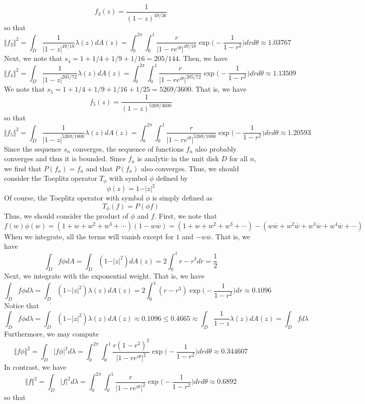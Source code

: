 \documentclass[12pt]{article}
\begin{document}
\[
f_3(z) = \frac{1}{(1-z)^{49/36}}
\] so that
\[
\Vert f_3 \Vert^2 = \int_D \frac{1}{\vert 1 - z \vert^{49/18}} \lambda(z) dA(z) = \int_0^{2\pi} \int_0^1 \frac{r}{\vert 1 - re^{i\theta} \vert^{49/18}} \exp\bigg(-\frac{1}{1-r^2}\bigg) dr d\theta \approx 1.03767
\] Next, we note that $s_4 = 1 + 1/4 + 1/9 + 1/16 = 205/144$. Then, we have
\[
\Vert f_4 \Vert^2 = \int_D \frac{1}{\vert 1 - z\vert^{205/72}} \lambda(z) dA(z) = \int_0^{2\pi} \int_0^1 \frac{r}{\vert 1 - re^{i\theta} \vert^{205/72}} \exp\bigg(-\frac{1}{1-r^2}\bigg) dr d\theta \approx 1.13509
\] We note that $s_5 = 1 + 1/4 + 1/9 + 1/16 + 1/25 = 5269/3600$. That is, we have
\[
f_5(z) = \frac{1}{(1-z)^{5269/3600}}
\] so that
\[
\Vert f_5 \Vert^2 = \int_D \frac{1}{\vert 1 - z\vert^{5269/1800}} \lambda(z) dA(z) = \int_0^{2\pi} \int_0^1 \frac{r}{\vert 1 - re^{i\theta} \vert^{5269/1800}} \exp\bigg(-\frac{1}{1-r^2}\bigg) dr d\theta \approx 1.20593
\] Since the sequence $s_n$ converges, the sequence of functions $f_n$ also probably converges and thus it is bounded. Since $f_n$ is analytic in the unit disk $D$ for all $n$, we find that $P(f_n) = f_n$ and that $P(f_n)$ also converges. Thus, we should consider the Toeplitz operator $T_\phi$ with symbol $\phi$ defined by 
\[
\phi(z) = 1 - \vert z \vert^2
\] Of course, the Toeplitz operator with symbol $\phi$ is simply defined as
\[
T_\phi(f) = P(\phi f)
\] Thus, we should consider the product of $\phi$ and $f$. First, we note that
\[
f(w) \phi(w) = (1+w+w^2+w^3+\cdots)(1-w\overline{w}) = (1  + w + w^2 + w^3 +\cdots) - (w\overline{w} + w^2 \overline{w} + w^3\overline{w} + w^4 \overline{w} + \cdots)
\] When we integrate, all the terms will vanish except for $1$ and $-w\overline{w}$. That is, we have
\[
\int_D f\phi dA = \int_D (1- \vert z \vert^2) dA(z) = 2 \int_0^1 r - r^3 dr = \frac{1}{2}
\] Next, we integrate with the exponential weight. That is, we have
\[
\int_D f \phi d\lambda = \int_D (1 - \vert z \vert^2) \lambda(z) dA(z) = 2 \int_0^1 (r - r^3)\exp\bigg(-\frac{1}{1-r^2}\bigg) dr \approx 0.1096
\] Notice that
\[
\int_D f \phi d\lambda = \int_D (1 - \vert z \vert^2) \lambda(z) dA(z) \approx 0.1096 \leq 0.4665 \approx \int_D \frac{1}{1-z} \lambda(z) dA(z) = \int_D f d\lambda
\] Furthermore, we may compute
\[
\Vert f\phi \Vert^2 = \int_D \vert f\phi \vert^2 d\lambda = \int_0^{2\pi} \int_0^1 \frac{r(1-r^2)^2}{\vert 1 - re^{i\theta}\vert^2} \exp\bigg(-\frac{1}{1-r^2}\bigg) dr d\theta \approx 0.344607
\] In contrast, we have
\[
\Vert f \Vert^2 = \int_D \vert f \vert^2 d\lambda = \int_0^{2\pi} \int_0^1 \frac{r}{\vert 1 - re^{i\theta}\vert^2} \exp\bigg(-\frac{1}{1-r^2}\bigg) dr d\theta \approx 0.6892
\] so that
\end{document}
